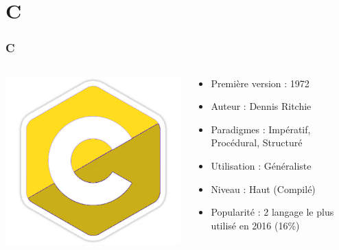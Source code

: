 \documentclass{beamer}
\begin{document}
	\section{C}
	\begin{frame}
	\frametitle{C}
	\begin{columns}

	\begin{column}{3cm}
					\includegraphics[scale=0.26]{c.png}
	\end{column}

	\begin{column}{7cm}
		\begin{itemize}
			\item Première version : 1972
			\item Auteur : Dennis Ritchie
			\item Paradigmes : Impératif, Procédural, Structuré
			\item Utilisation : Généraliste
			\item Niveau : Haut (Compilé)
			\item Popularité : 2 langage le plus utilisé en 2016 (16\%)
		\end{itemize}
	\end{column}
	\end{columns}
	\end{frame}
	
\end{document}
